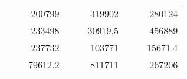 \begin{table}[H]
\begin{tabular}{|ccrccrccc}
\rowcolor[HTML]{DAE8FC} 
\multicolumn{1}{|c|}{\cellcolor[HTML]{FFFFC7}}                                & \multicolumn{1}{c|}{\cellcolor[HTML]{DAE8FC}}                      & \multicolumn{1}{r|}{\cellcolor[HTML]{DAE8FC}200799}    & \multicolumn{1}{c|}{\cellcolor[HTML]{FFFFC7}}                                & \multicolumn{1}{c|}{\cellcolor[HTML]{DAE8FC}}                       & \multicolumn{1}{r|}{\cellcolor[HTML]{DAE8FC}319902}    & \multicolumn{1}{c|}{\cellcolor[HTML]{FFFFC7}}                                & \multicolumn{1}{c|}{\cellcolor[HTML]{DAE8FC}}                      & \multicolumn{1}{r|}{\cellcolor[HTML]{DAE8FC}280124}    \\ \cline{3-3} \cline{6-6} \cline{9-9} 
\multicolumn{1}{|c|}{\cellcolor[HTML]{FFFFC7}}                                & \multicolumn{1}{c|}{\cellcolor[HTML]{DAE8FC}}                      & \multicolumn{1}{r|}{\cellcolor[HTML]{DDFDFF}233498}    & \multicolumn{1}{c|}{\cellcolor[HTML]{FFFFC7}}                                & \multicolumn{1}{c|}{\cellcolor[HTML]{DAE8FC}}                       & \multicolumn{1}{r|}{\cellcolor[HTML]{DDFDFF}30919.5}   & \multicolumn{1}{c|}{\cellcolor[HTML]{FFFFC7}}                                & \multicolumn{1}{c|}{\cellcolor[HTML]{DAE8FC}}                      & \multicolumn{1}{r|}{\cellcolor[HTML]{DDFDFF}456889}    \\ \cline{3-3} \cline{6-6} \cline{9-9} 
\rowcolor[HTML]{DAE8FC} 
\multicolumn{1}{|c|}{\cellcolor[HTML]{FFFFC7}}                                & \multicolumn{1}{c|}{\cellcolor[HTML]{DAE8FC}}                      & \multicolumn{1}{r|}{\cellcolor[HTML]{DAE8FC}237732}    & \multicolumn{1}{c|}{\cellcolor[HTML]{FFFFC7}}                                & \multicolumn{1}{c|}{\cellcolor[HTML]{DAE8FC}}                       & \multicolumn{1}{r|}{\cellcolor[HTML]{DAE8FC}103771}    & \multicolumn{1}{c|}{\cellcolor[HTML]{FFFFC7}}                                & \multicolumn{1}{c|}{\cellcolor[HTML]{DAE8FC}}                      & \multicolumn{1}{r|}{\cellcolor[HTML]{DAE8FC}15671.4}   \\ \cline{3-3} \cline{6-6} \cline{9-9} 
\multicolumn{1}{|c|}{\cellcolor[HTML]{FFFFC7}}                                & \multicolumn{1}{c|}{\cellcolor[HTML]{DAE8FC}}                      & \multicolumn{1}{r|}{\cellcolor[HTML]{DDFDFF}79612.2}   & \multicolumn{1}{c|}{\cellcolor[HTML]{FFFFC7}}                                & \multicolumn{1}{c|}{\cellcolor[HTML]{DAE8FC}}                       & \multicolumn{1}{r|}{\cellcolor[HTML]{DDFDFF}811711}    & \multicolumn{1}{c|}{\cellcolor[HTML]{FFFFC7}}                                & \multicolumn{1}{c|}{\cellcolor[HTML]{DAE8FC}}                      & \multicolumn{1}{r|}{\cellcolor[HTML]{DDFDFF}267206}    \\ \cline{3-3} \cline{6-6} \cline{9-9} 

\end{tabular}
\end{table}
